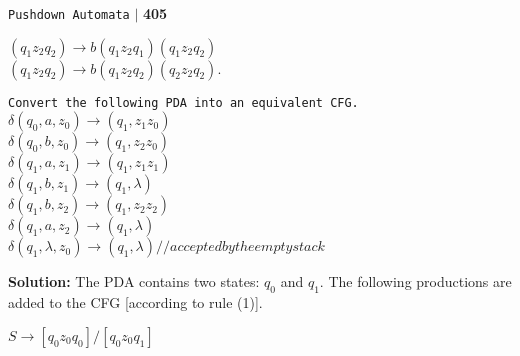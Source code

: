 \documentclass{article}
\begin{document}
\begin{flushright}
 \texttt{Pushdown Automata} \hspace*{0.10cm}\textbf{$|$} \textbf{405}\hspace*{0.5cm}
\end{flushright}

\vspace*{0.5cm}
\begin{center}
   $(q_1 z_2 q_2) \rightarrow b(q_1 z_2 q_1) (q_1 z_2 q_2)$\\
   $(q_1 z_2 q_2) \rightarrow b(q_1 z_2 q_2) (q_2 z_2 q_2)$.\\
\end{center}

\hspace*{0.1cm} \texttt{\small{Convert the following PDA into an equivalent CFG.}}\\


\hspace*{2cm} $\delta(q_0, a, z_0) \rightarrow (q_1, z_1z_0)$ \\
\hspace*{2cm} $\delta(q_0, b, z_0) \rightarrow (q_1, z_2z_0)$\\
\hspace*{2cm} $\delta(q_1, a, z_1) \rightarrow (q_1, z_1z_1)$\\
\hspace*{2cm} $\delta(q_1, b, z_1) \rightarrow  (q_1, \lambda)$\\
\hspace*{2cm} $\delta(q_1, b, z_2) \rightarrow (q_1, z_2z_2)$\\
\hspace*{2cm} $\delta(q_1, a, z_2) \rightarrow (q_1, \lambda)$\\
\hspace*{2cm} $\delta(q_1, \lambda, z_0) \rightarrow (q_1, \lambda) // accepted by the empty stack$ \\

\vspace*{0.5cm}

\textbf{Solution:} The PDA contains two states: $q_0$ and $q_1$. The following productions are added to the CFG
[according to rule (1)].\\
\begin{center}
  $S \rightarrow [q_0 z_0 q_0]/[q_0 z_0 q_1]$\\
\end{center}
\end{document}
